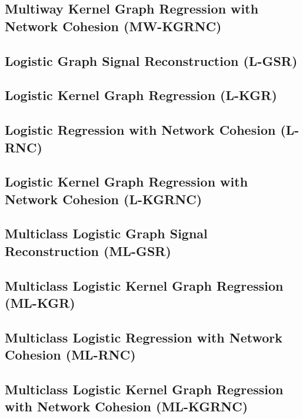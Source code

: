 \subsection{Multiway Kernel Graph Regression with Network Cohesion (MW-KGRNC)}

\subsection{Logistic Graph Signal Reconstruction (L-GSR)}

\subsection{Logistic Kernel Graph Regression (L-KGR)}

\subsection{Logistic Regression with Network Cohesion (L-RNC)}

\subsection{Logistic Kernel Graph Regression with Network Cohesion (L-KGRNC)}

\subsection{Multiclass Logistic Graph Signal Reconstruction (ML-GSR)}

\subsection{Multiclass Logistic Kernel Graph Regression (ML-KGR)}

\subsection{Multiclass Logistic Regression with Network Cohesion (ML-RNC)}

\subsection{Multiclass Logistic Kernel Graph Regression with Network Cohesion (ML-KGRNC)}